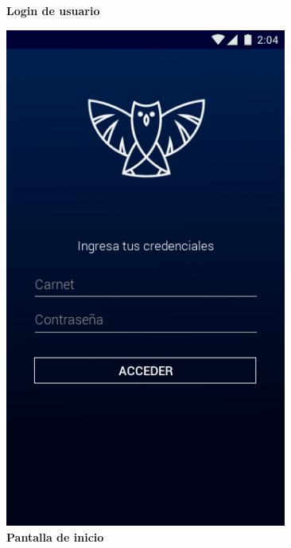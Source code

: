 \documentclass[12pt]{article}
\begin{document}
\begin{figure}[t]
	\centering
	\begin{minipage}[t]{0.45\textwidth}
		\centering
		\caption{\textbf{Login de usuario}}
		\includegraphics[width=0.825\textwidth]{img/1.png}
	\end{minipage}\hfill
	\begin{minipage}[t]{0.45\textwidth}
		\centering
		\caption{\textbf{Pantalla de inicio}}
		\label{fig:horarioDiario}

\end{minipage}
\end{figure}
\end{document}
